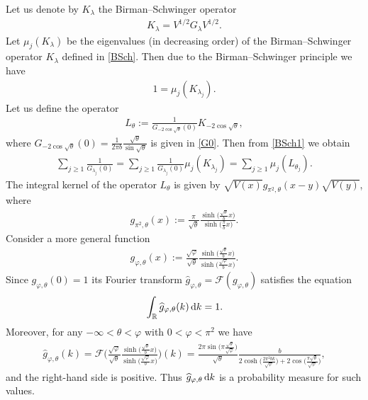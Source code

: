 Let us denote by $K_\lambda$ the Birman--Schwinger operator
\begin{gather}\label{BSch}
K_\lambda = V^{1/2} G_\lambda V^{1/2}.
\end{gather}
Let $\mu_j(K_\lambda)$ be the eigenvalues (in decreasing order) of the Birman--Schwinger operator $K_\lambda$ defined in \eqref{BSch}.
Then due to the Birman--Schwinger principle we have
\begin{gather}\label{BSch1}
1 = \mu_j(K_{\lambda_j}).
\end{gather}
Let us define the operator
\begin{gather*}%
L_{\theta}:=\frac{1}{G_{-2\cos\sqrt{\theta}}(0)} K_{-2\cos\sqrt{\theta}} ,
\end{gather*}
where $G_{-2\cos\sqrt{\theta}}(0) =\frac{1}{2\pi b}\frac{\sqrt{\theta}}{\sin\sqrt{\theta}}$ is given in \eqref{G0}.
Then from \eqref{BSch1} we obtain
\begin{gather*}
\sum_{j\ge 1} \frac{1}{G_{\lambda_j}(0)}
=\sum_{j\ge 1} \frac{1}{G_{\lambda_j}(0)} \mu_j(K_{\lambda_j})=\sum_{j\ge 1}\mu_j(L_{\theta_j}).
\end{gather*}
The integral kernel of the operator $L_\theta$ is given by $\sqrt{V(x)}g_{\pi^2,\theta}(x-y)\sqrt{V(y)}$, where
\begin{gather*}
g_{\pi^2,\theta}(x):=
\frac{\pi}{\sqrt{\theta}}\frac{\sinh \big(\frac{\sqrt{\theta}}{b}x\big)}{\sinh \big(\frac{\pi}{b}x\big)}.
\end{gather*}
Consider a more general function
\begin{gather*}
g_{\varphi,\theta}(x):=
\frac{\sqrt\varphi}{\sqrt{\theta}}\frac{\sinh \big(\frac{\sqrt{\theta}}{b}x\big)}{\sinh \big(\frac{\sqrt\varphi}{b}x\big)}.
\end{gather*}
Since $g_{\varphi,\theta}(0)=1$ its Fourier transform
$\widehat{g}_{\varphi,\theta} = \mathcal{F} (g_{\varphi,\theta})$ satisfies the equation
\begin{gather*}
\int_{\mathbb R} \widehat{g}_{\varphi,\theta}(k) \, {\rm d} k = 1.
\end{gather*}
Moreover, for any $-\infty<\theta <\varphi$ with $0<\varphi <\pi^2$ we have
\begin{gather*}
 \widehat{g}_{\varphi,\theta}(k) = \mathcal{F} \Bigg(\frac{\sqrt\varphi}{\sqrt{\theta}} \frac{\sinh\big(\frac{\sqrt{\theta}}{b}x\big)}{\sinh\big(\frac{\sqrt\varphi}{b}x\big)}\Bigg)(k)
 = \frac{2\pi \sin\big(\pi \frac{\sqrt\theta}{\sqrt\varphi}\big)}{\sqrt\theta} \frac{b}{2\cosh \big(\frac{2\pi^2 b k}{\sqrt\varphi}\big) + 2\cos\big(\frac{\pi\sqrt\theta}{\sqrt\varphi}\big)},
\end{gather*}
and the right-hand side is positive. Thus $\widehat{g}_{\varphi,\theta}\, {\rm d} k$ is a probability measure for such values.

